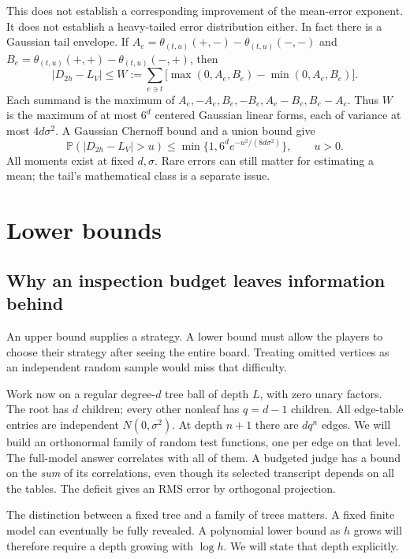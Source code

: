\documentclass[11pt]{article}
\theoremstyle{definition}
\theoremstyle{remark}
\newcommand{\Prob}{\mathbb P}
\newcommand{\err}{|D_{2h}-L_V|}
\begin{document}
This does not establish a corresponding improvement of the mean-error
exponent. It does not establish a heavy-tailed error distribution either.
In fact there is a Gaussian tail envelope. If
$A_e=\theta_{(t,u)}(+,-)-\theta_{(t,u)}(-,-)$ and
$B_e=\theta_{(t,u)}(+,+)-\theta_{(t,u)}(-,+)$, then
\begin{equation}
 \err\le W:=\sum_{e\ni t}\bigl[\max(0,A_e,B_e)-\min(0,A_e,B_e)\bigr].
 \label{eq:envelope}
\end{equation}
Each summand is the maximum of
$A_e,-A_e,B_e,-B_e,A_e-B_e,B_e-A_e$. Thus $W$ is the maximum of at most
$6^d$ centered Gaussian linear forms, each of variance at most
$4d\sigma^2$. A Gaussian Chernoff bound and a union bound give
\begin{equation}
 \Prob(\err>u)\le\min\{1,6^d e^{-u^2/(8d\sigma^2)}\},\qquad u>0.
 \label{eq:tail}
\end{equation}
All moments exist at fixed $d,\sigma$. Rare errors can still matter for
estimating a mean; the tail's mathematical class is a separate issue.

\clearpage
\section{Lower bounds}
\label{sec:lower}

\subsection{Why an inspection budget leaves information behind}
An upper bound supplies a strategy. A lower bound must allow the players
to choose their strategy after seeing the entire board. Treating omitted
vertices as an independent random sample would miss that difficulty.

Work now on a regular degree-$d$ tree ball of depth $L$, with zero unary
factors. The root has $d$ children; every other nonleaf has $q=d-1$
children. All edge-table entries are independent $N(0,\sigma^2)$.
At depth $n+1$ there are $dq^n$ edges. We will build an orthonormal family
of random test functions, one per edge on that level. The full-model answer
correlates with all of them. A budgeted judge has a bound on the \emph{sum}
of its correlations, even though its selected transcript depends on all
the tables. The deficit gives an RMS error by orthogonal projection.

The distinction between a fixed tree and a family of trees matters. A
fixed finite model can eventually be fully revealed. A polynomial lower
bound as $h$ grows will therefore require a depth growing with $\log h$.
We will state that depth explicitly.
\end{document}
